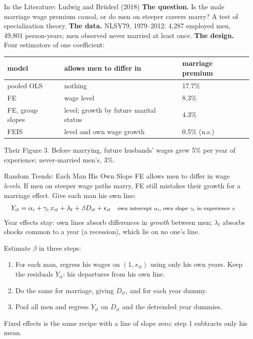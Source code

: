 \documentclass[aspectratio=169,11pt,xcolor=dvipsnames]{beamer}
\begin{document}
\begin{frame}{In the Literature: Ludwig and Brüderl (2018)}
\textbf{The question.} Is the male marriage wage premium causal, or do men on
steeper careers marry? A test of specialization theory.
\vskip3pt
\textbf{The data.} NLSY79, 1979--2012: 4,287 employed men, 49,801
person-years; men observed never married at least once.
\vskip3pt
\textbf{The design.} Four estimators of one coefficient:
\vskip2pt
\begin{center}\small
\renewcommand{\arraystretch}{1.12}
\begin{tabular}{@{}lll@{}}
\toprule
model & allows men to differ in & marriage premium \\
\midrule
pooled OLS & nothing & 17.7\% \\
FE & wage level & 8.3\% \\
FE, group slopes & level; growth by future marital status & 4.3\% \\
FEIS & level and own wage growth & 0.5\% (n.s.) \\
\bottomrule
\end{tabular}
\end{center}
\vskip2pt
{\footnotesize Their Figure 3. Before marrying, future husbands' wages grew 5\% per
year of experience; never-married men's, 3\%.}
\end{frame}

\begin{frame}{Random Trends: Each Man His Own Slope}
FE allows men to differ in wage \emph{levels}. If men on steeper wage paths
marry, FE still mistakes their growth for a marriage effect. Give each man his own line:
\begin{align*}
  Y_{it} &= \alpha_i + \gamma_i\,x_{it} + \lambda_t + \beta D_{it} + \epsilon_{it}
   && \text{\footnotesize own intercept $\alpha_i$, own slope $\gamma_i$ in experience $x$}
\end{align*}
Year effects stay: own lines absorb differences in \emph{growth} between men; $\lambda_t$ absorbs
shocks common to a year (a recession), which lie on no one's line.
\par\vskip2pt
Estimate $\beta$ in three steps:
\begin{enumerate}\itemsep4pt
  \item For each man, regress his wages on $(1, x_{it})$ using only his own years.
        Keep the residuals $\ddot Y_{it}$: his departures from his own line.
  \item Do the same for marriage, giving $\ddot D_{it}$, and for each year dummy.
  \item Pool all men and regress $\ddot Y_{it}$ on $\ddot D_{it}$ and the detrended year dummies.
\end{enumerate}
\vskip3pt
Fixed effects is the same recipe with a line of slope zero: step 1 subtracts only his mean.
\end{frame}
\end{document}
